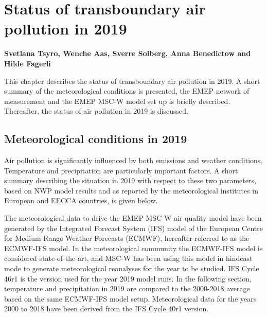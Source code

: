 \chapter[Status in 2019]{Status of transboundary air pollution in 2019}
\label{ch:chapterStatus}

{\bf{Svetlana Tsyro, Wenche Aas, Sverre Solberg, Anna Benedictow and Hilde Fagerli}}
\vspace{30pt}

This chapter describes the status of transboundary air pollution in 2019. A short summary of the meteorological conditions is presented, the EMEP network of measurement and the EMEP MSC-W model set up is briefly described. Thereafter, the status of air pollution in 2019 is discussed.

\section{Meteorological conditions in 2019}
\label{sec:meteo}
Air pollution is significantly influenced by both emissions and weather conditions. Temperature and precipitation are particularly important factors. A short summary describing the situation in 2019 with respect to these two parameters, based on NWP model results and as reported by the meteorological institutes in European and EECCA countries, is given below.

The meteorological data to drive the EMEP MSC-W air quality model have been generated by the Integrated Forecast System (IFS) model of the European Centre for Medium-Range Weather Forecasts (ECMWF), hereafter referred to as the ECMWF-IFS model. In the meteorological community the ECMWF-IFS model is considered state-of-the-art, and MSC-W has been using this model in hindcast mode to generate meteorological reanalyses for the year to be studied. IFS Cycle 46r1 is the version used for the year 2019 model runs. In the following section, temperature and precipitation in 2019 are compared to the 2000-2018 average based on the same ECMWF-IFS model setup. Meteorological data for the years 2000 to 2018 have been derived from the IFS Cycle 40r1 version.

